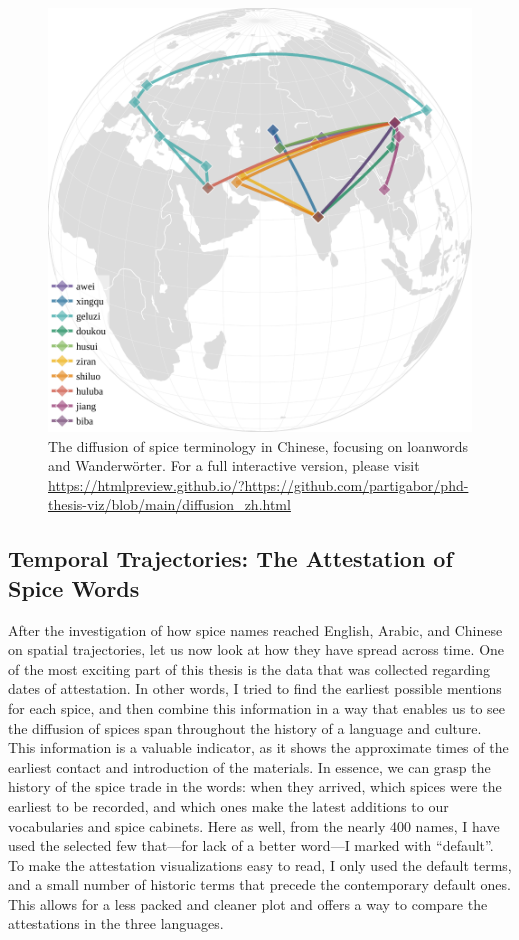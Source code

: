 \begin{figure}[ht!]
    \includegraphics[width=\linewidth]{imgs/plots/diffusion_zh.pdf}
    \caption{The diffusion of spice terminology in Chinese, focusing on loanwords and Wanderwörter. For a full interactive version, please visit \url{https://htmlpreview.github.io/?https://github.com/partigabor/phd-thesis-viz/blob/main/diffusion_zh.html}}
    \label{fig:diffusion_zh}
\end{figure}

\blindtext

\subsection{Temporal Trajectories: The Attestation of Spice Words}

After the investigation of how spice names reached English, Arabic, and Chinese on spatial trajectories, let us now look at how they have spread across time. One of the most exciting part of this thesis is the data that was collected regarding dates of attestation. In other words, I tried to find the earliest possible mentions for each spice, and then combine this information in a way that enables us to see the diffusion of spices span throughout the history of a language and culture. This information is a valuable indicator, as it shows the approximate times of the earliest contact and introduction of the materials. In essence, we can grasp the history of the spice trade in the words: when they arrived, which spices were the earliest to be recorded, and which ones make the latest additions to our vocabularies and spice cabinets. Here as well, from the nearly 400 names, I have used the selected few that---for lack of a better word---I marked with ``default''. To make the attestation visualizations easy to read, I only used the default terms, and a small number of historic terms that precede the contemporary default ones. This allows for a less packed and cleaner plot and offers a way to compare the attestations in the three languages. 


